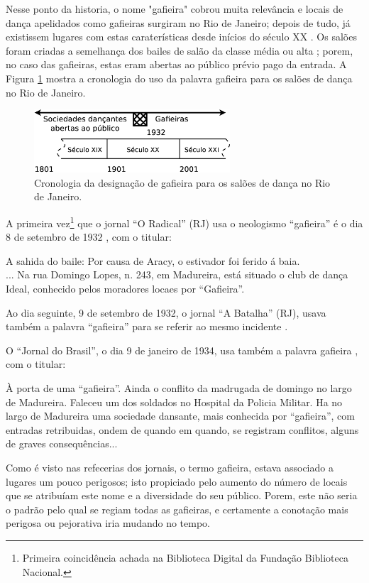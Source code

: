 Nesse ponto da historia, 
o nome "gafieira" cobrou muita relevância e locais de dança apelidados como gafieiras surgiram no Rio de Janeiro;
depois de tudo, já existissem lugares com estas caraterísticas desde inícios do século XX \cite[pp. 49]{diniz2003almanaque}.
Os salões foram criadas a semelhança dos bailes de salão da classe média ou alta \cite[pp. 78]{coutinho2006cronistas}; 
porem, no caso das gafieiras, estas eram abertas ao público prévio pago da entrada.
A Figura \ref{fig:gafieiracrono} mostra a cronologia do uso da palavra gafieira para os salões de dança no Rio de Janeiro.
\begin{figure}[h]
  \centering
    \includegraphics[width=0.65\textwidth]{chapters/cap-historia-gafieiras/gafieira-crono.eps}
  \caption{Cronologia da designação de gafieira para os salões de dança no Rio de Janeiro.}
  \label{fig:gafieiracrono}
\end{figure}

A primeira vez\footnote{Primeira coincidência achada na Biblioteca Digital da Fundação Biblioteca Nacional.} 
que o jornal ``O Radical'' (RJ) usa o neologismo ``gafieira'' 
é o dia 8 de setembro de 1932 \cite[pp. 12]{gafieirajournaloradical1},
com o titular:
\begin{citando}%
A sahida do baile: Por causa de Aracy, o estivador foi ferido á baia.\\
... Na rua Domingo Lopes, n. 243, em Madureira, está situado o club de dança Ideal, 
conhecido pelos moradores locaes por ``Gafieira''.
\end{citando} 
Ao dia seguinte, 9 de setembro de 1932, o jornal ``A Batalha'' (RJ), 
usava também a palavra ``gafieira'' para se referir ao mesmo incidente \cite[pp. 8]{gafieirajournalabatalha1}.

O ``Jornal do Brasil'', o dia 9 de janeiro de 1934, 
usa também a palavra gafieira \cite[pp. 11]{gafieirajournalbrasil1}, com o titular:
\begin{citando}%
À porta de uma ``gafieira''.
Ainda o conflito da madrugada de domingo no largo de Madureira.
Faleceu um dos soldados no Hospital da Policia Militar. 
Ha no largo de Madureira uma sociedade dansante, mais conhecida por ``gafieira'', 
com entradas retribuidas, ondem de quando em quando, se registram conflitos, 
alguns de graves consequências...
\end{citando} 
Como é visto nas refecerias dos jornais, 
o termo gafieira, estava associado a lugares um pouco perigosos;
isto propiciado pelo aumento do número de locais que se atribuíam este nome e a diversidade do seu público.
Porem, este não seria o padrão pelo qual se regiam todas as gafieiras, 
e certamente a conotação mais perigosa ou pejorativa iria mudando no tempo. 


